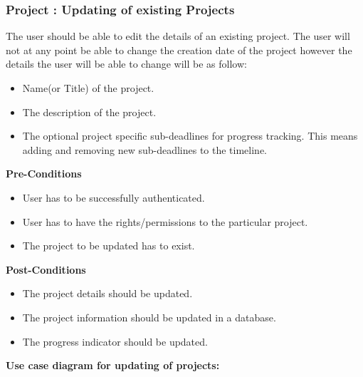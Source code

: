 \subsubsection{Project : Updating of existing Projects}
	The user should be able to edit the details of an existing project. The user will not at any point be able to change the creation date of the project however the details the user will be able to change will be as follow:
	\begin{itemize}
		\item Name(or Title) of the project.
		\item The description of the project.
		\item The optional project specific sub-deadlines for progress tracking. This means adding and removing new sub-deadlines to the timeline.
	\end{itemize}
\textbf{Pre-Conditions}
\begin{itemize}
	\item User has to be successfully authenticated.
	\item User has to have the rights/permissions to the particular project.
	\item The project to be updated has to exist. 
\end{itemize}
\textbf{Post-Conditions}
\begin{itemize}
	\item The project details should be updated.
	\item The project information should be updated in a database.
	\item The progress indicator should be updated.
\end{itemize}
\textbf{Use case diagram for updating of projects: }\\
\centerline{}

